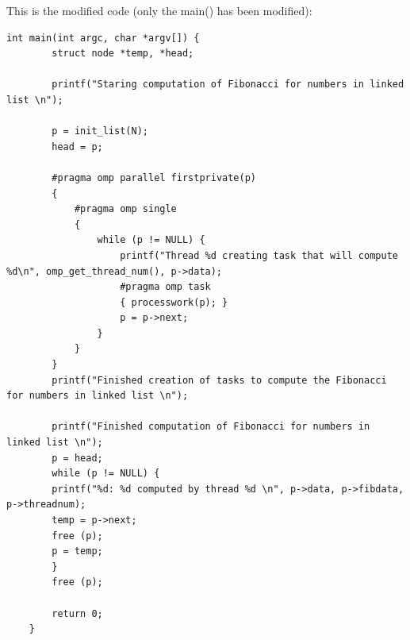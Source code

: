 \documentclass[12]{article}
\begin{document}
This is the modified code (only the main() has been modified):
\medskip
\begin{lstlisting}[frame=single]
    int main(int argc, char *argv[]) {
        struct node *temp, *head;

        printf("Staring computation of Fibonacci for numbers in linked list \n");

        p = init_list(N);
        head = p;

        #pragma omp parallel firstprivate(p)
        {
            #pragma omp single
            {
                while (p != NULL) {
                    printf("Thread %d creating task that will compute %d\n", omp_get_thread_num(), p->data);
                    #pragma omp task 
                    { processwork(p); }
                    p = p->next;
                }
            }
        }
        printf("Finished creation of tasks to compute the Fibonacci for numbers in linked list \n");

        printf("Finished computation of Fibonacci for numbers in linked list \n");
        p = head;
        while (p != NULL) {
        printf("%d: %d computed by thread %d \n", p->data, p->fibdata, p->threadnum);
        temp = p->next;
        free (p);
        p = temp;
        }
        free (p);

        return 0;
    } 
\end{lstlisting}

\bigskip
\end{document}
